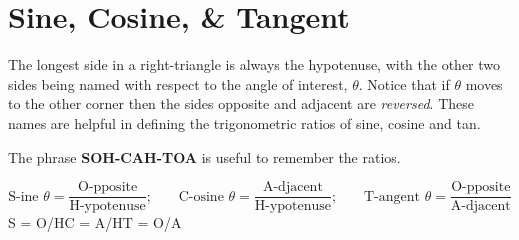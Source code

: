\section*{Sine, Cosine, \& Tangent}

The longest side in a right-triangle is always the hypotenuse, with the other two sides being named with respect to the angle of interest, $\theta$. Notice that if $\theta$ moves to the other corner then the sides opposite and adjacent are \textit{reversed}. These names are helpful in defining the trigonometric ratios of sine, cosine and tan.

The phrase \textbf{SOH-CAH-TOA} is useful to remember the ratios.
\begin{tcolorbox}
\begin{equation*}\text{S-ine }  \theta  =\frac{\text{O-pposite}}{\text{H-ypotenuse}}\text{;}\qquad\text{C-osine }  \theta  =\frac{\text{A-djacent}}{\text{H-ypotenuse}}\text{;}\qquad\text{T-angent }  \theta  =\frac{\text{O-pposite}}{\text{A-djacent}}
\end{equation*}\medskip
\hspace{1.7cm}S = O/H\hspace{3.5cm}C = A/H\hspace{3.8cm}T = O/A
\end{tcolorbox}

